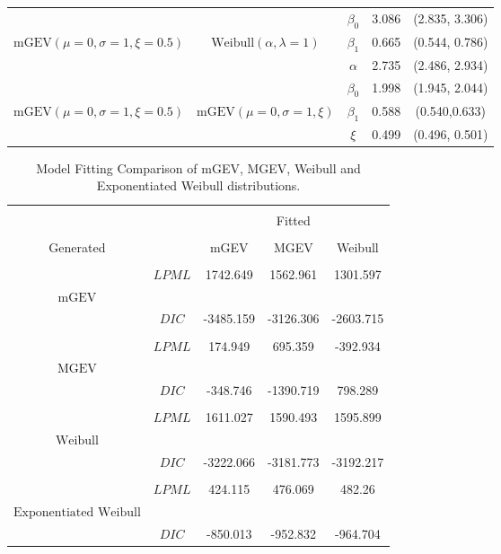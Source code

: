 \documentclass[smallextended]{svjour3}       %
\providecommand{\tabularnewline}{\\}
\begin{document}
{\begin{table}[!p]
\begin{tabular}{ccccc}
 &  & {\small $\beta_{0}$ } & {\small 3.086 }  & {\small (2.835, 3.306)}\tabularnewline
 {{\small $\mbox{mGEV}(\mu=0,\sigma=1,\xi=0.5)$ }} & {{\small $\mbox{Weibull}(\alpha,\lambda=1)$ }} & {\small
 $\beta_{1}$ } & {\small 0.665 } & {\small (0.544, 0.786)}\tabularnewline
 &  & {\small $\alpha$ } & {\small 2.735 } & {\small (2.486, 2.934)}\tabularnewline

 &  & {\small $\beta_{0}$ } & {\small 1.998 }  & {\small (1.945, 2.044)}\tabularnewline
 {{\small $\mbox{mGEV}(\mu=0,\sigma=1,\xi=0.5)$ }} & {{\small $\mbox{mGEV}(\mu=0,\sigma=1,\xi)$ }} & {\small $\beta_{1}$ } & {\small 0.588 } & {\small
 (0.540,0.633)}\tabularnewline
 &  & {\small $\xi$ } & {\small 0.499 } & {\small (0.496, 0.501)}\tabularnewline
\hline
\end{tabular}
\end{table}

\renewcommand{\arraystretch}{.5}
\setlength{\tabcolsep}{10pt}
\begin{table}[!p]
{\small \caption{Model Fitting Comparison of mGEV, MGEV, Weibull and Exponentiated Weibull distributions.}}{\small \par}
\centering{}{\small }%
\begin{tabular}{ccccc}
\hline
\hline\\
&&&{Fitted}&\\
\cline{3-5}\\
{Generated}& & {\small mGEV}& {\small MGEV}& {\small Weibull}\\ \hline\\
& {\small $LPML$}&{\small 1742.649}&{\small 1562.961}& {\small 1301.597}\tabularnewline
{\small $\mbox {mGEV}$}&&&&\tabularnewline
& {\small $DIC$}&{\small -3485.159} &{\small -3126.306}&{\small -2603.715}\\\\
& {\small $LPML$}&{\small 174.949}&{\small	695.359}	&{\small -392.934}\tabularnewline
{\small $\mbox{MGEV}$}&&&&\tabularnewline
& {\small $DIC$} &{\small -348.746}	&{\small -1390.719} &{\small	798.289}\\\\
& {\small $LPML$}&{\small 1611.027}&{\small	1590.493}	&{\small 1595.899}\tabularnewline
{\small $\mbox{Weibull}$}&&&& \tabularnewline
& {\small $DIC$} &{\small -3222.066} &{\small -3181.773} &{\small -3192.217}\\\\
& {\small $LPML$}&{\small 424.115}&{\small	476.069}	&{\small 482.26}\tabularnewline
{\small $\mbox{Exponentiated Weibull}$}&&&& \tabularnewline
& {\small $DIC$} &{\small -850.013} &{\small -952.832} &{\small -964.704}\\
\hline
\end{tabular}
\end{table}

}
\end{document}
